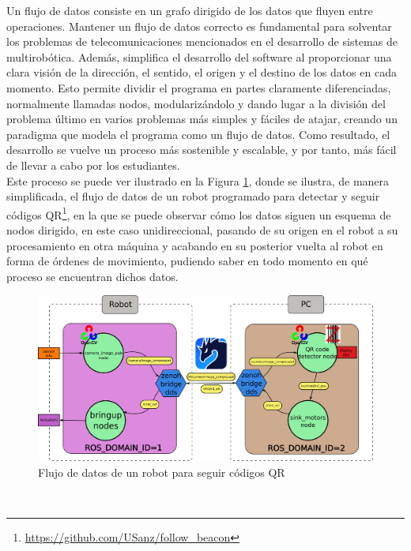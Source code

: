 Un flujo de datos consiste en un grafo dirigido de los datos que fluyen entre
operaciones.
Mantener un flujo de datos correcto es fundamental para solventar los problemas
de telecomunicaciones mencionados en el desarrollo de sistemas de multirobótica.
Además, simplifica el desarrollo del software al proporcionar una clara visión
de la dirección, el sentido, el origen y el destino de los datos en cada
momento.
Esto permite dividir el programa en partes claramente diferenciadas, normalmente
llamadas nodos, modularizándolo y dando lugar a la división del problema último
en varios problemas más simples y fáciles de atajar, creando un paradigma que
modela el programa como un flujo de datos.
Como resultado, el desarrollo se vuelve un proceso más sostenible y escalable, y
por tanto, más fácil de llevar a cabo por los estudiantes.
\\

Este proceso se puede ver ilustrado en la Figura \ref{fig:data_flow_qr_example},
donde se ilustra, de manera simplificada, el flujo de datos de un robot
programado para detectar y seguir códigos QR\footnote{
\href{https://github.com/USanz/follow_beacon}{https://github.com/USanz/follow\_beacon}},
en la que se puede observar cómo los datos siguen un esquema de nodos dirigido,
en este caso unidireccional, pasando de su origen en el robot a su procesamiento
en otra máquina y acabando en su posterior vuelta al robot en forma de órdenes
de movimiento, pudiendo saber en todo momento en qué proceso se encuentran
dichos datos.

\begin{figure} [h!]
  \begin{center}
    \includegraphics[width=15cm]{figs/QR_code_data_flow}
  \end{center}
  \caption{Flujo de datos de un robot para seguir códigos QR}
  \label{fig:data_flow_qr_example}
\end{figure}\

